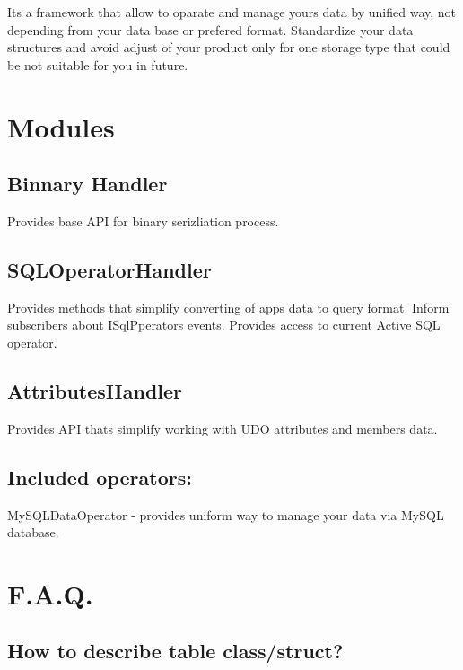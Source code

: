 It\textquotesingle{}s a framework that allow to oparate and manage yours data by unified way, not depending from your data base or prefered format. Standardize your data structures and avoid adjust of your product only for one storage type that could be not suitable for you in future.

\section*{Modules}

\subsection*{Binnary Handler}

Provides base A\+PI for binary serizliation process.

\subsection*{S\+Q\+L\+Operator\+Handler}

Provides methods that simplify converting of app\textquotesingle{}s data to query format. Inform subscribers about {\ttfamily I\+Sql\+Pperators} events. Provides access to current {\ttfamily Active} S\+QL operator.

\subsection*{Attributes\+Handler}

Provides A\+PI thats simplify working with U\+DO attributes and members data.

\subsection*{Included operators\+:}


\begin{DoxyItemize}
\item {\ttfamily My\+S\+Q\+L\+Data\+Operator} -\/ provides uniform way to manage your data via My\+S\+QL database.
\end{DoxyItemize}

\section*{F.\+A.\+Q.}

\subsection*{How to describe table class/struct?}

